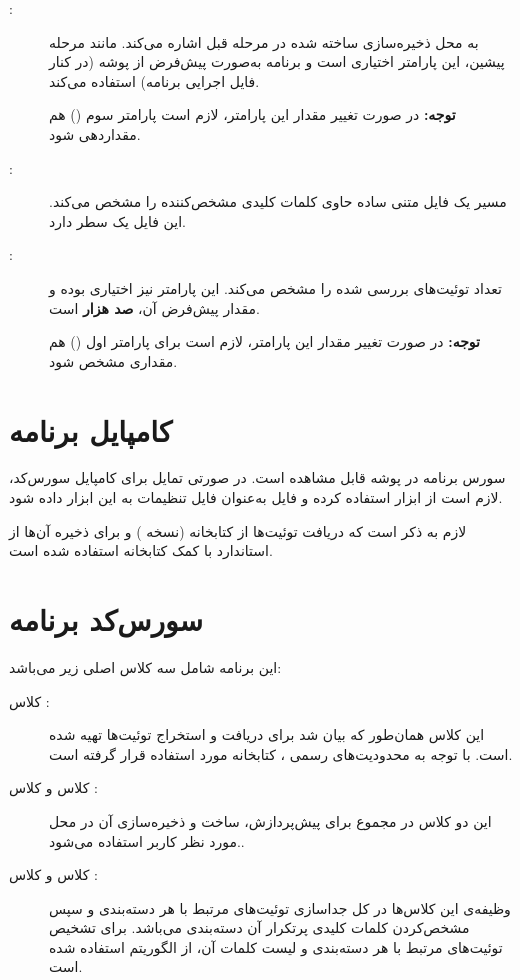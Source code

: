 \documentclass[a4paper, 12pt]{article}
\newcommand\code[1]{\lr{\ttfamily\fontseries{b}\selectfont{#1}}}
\begin{document}
\begin{description}
\item[\code{INDEX\_DIR}:]
به محل ذخیره‌سازی  ساخته شده در مرحله قبل اشاره می‌کند. مانند مرحله پیشین، این پارامتر اختیاری است و برنامه به‌صورت پیش‌فرض از پوشه  (در کنار فایل اجرایی برنامه) استفاده می‌کند.

\textbf{توجه:}
در صورت تغییر مقدار این پارامتر، لازم است پارامتر سوم (\code{RESULTS\_COUNT}) هم مقداردهی شود.
\item[\code{QUERIES\_FILE}:]
مسیر یک فایل متنی ساده حاوی کلمات کلیدی مشخص‌کننده را مشخص می‌کند. این فایل یک سطر دارد.
\item[\code{RESULTS\_COUNT}:]
تعداد توئیت‌های بررسی شده را مشخص می‌کند. این پارامتر نیز اختیاری بوده و مقدار پیش‌فرض آن، \textbf{صد هزار} است.

\textbf{توجه:}
در صورت تغییر مقدار این پارامتر، لازم است برای پارامتر اول (\code{INDEX\_DIR}) هم مقداری مشخص شود.
\end{description}
\section{کامپایل برنامه}
سورس برنامه در پوشه \code{src} قابل مشاهده است. در صورتی تمایل برای کامپایل سورس‌کد، لازم است از ابزار  استفاده کرده و فایل \code{pom.xml} به‌عنوان فایل تنظیمات به این ابزار داده شود.

لازم به ذکر است که دریافت توئیت‌ها از کتابخانه  (نسخه ) و برای ذخیره آن‌ها از استاندارد   با کمک کتابخانه  استفاده شده است.
\section{سورس‌کد برنامه}
این برنامه شامل سه کلاس اصلی زیر می‌باشد:
\begin{description}
\item[کلاس \code{Crawler}:]
این کلاس همان‌طور که بیان شد برای دریافت و استخراج توئیت‌ها تهیه شده است. با توجه به محدودیت‌های  رسمی ، کتابخانه  مورد استفاده قرار گرفته است.

\item[کلاس \code{Indexer} و کلاس \code{Writer}:]
این دو کلاس در مجموع برای پیش‌پردازش، ساخت  و ذخیره‌سازی آن در محل مورد نظر کاربر  استفاده می‌شود..

\item[کلاس \code{Classifier} و کلاس \code{Searcher}:]
وظیفه‌ی این کلاس‌ها در کل جداسازی توئیت‌های مرتبط با هر دسته‌بندی و سپس مشخص‌کردن کلمات کلیدی پرتکرار آن دسته‌بندی می‌باشد. برای تشخیص توئیت‌های مرتبط با هر دسته‌بندی و لیست کلمات آن، از الگوریتم  استفاده شده است.
\end{description}
\end{document}
